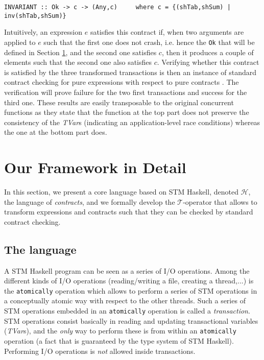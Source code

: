 \documentclass[submission,copyright,creativecommons]{eptcs}
\newcommand{\pt}{\ensuremath{\mathcal{T}}}
\begin{document}
\begin{footnotesize}
\begin{verbatim}
INVARIANT :: Ok -> c -> (Any,c)     where c = {(shTab,shSum) | inv(shTab,shSum)} 
\end{verbatim}
\end{footnotesize}
Intuitively, an expression $e$ satisfies this contract if, when two arguments are applied to $e$ such that the first one does not crash, i.e. hence the \texttt{Ok} that will be defined in Section \ref{details}, and the second one satisfies $c$, then it produces a couple of elements such that the second one also satisfies $c$.  
Verifying whether this contract is satisfied by the three transformed transactions is then an instance of standard contract checking for pure expressions with respect to pure contracts \cite{static-contract-checking}. The verification will prove failure for the two first transactions and success for the third one. 
These results are easily transposable to the original concurrent functions as they state that the function at the top part does not preserve the consistency of the \emph{TVar}s (indicating an application-level race conditions) whereas the one at the bottom part does.


\section{Our Framework in Detail}
\label{details}
In this section, we present a core language based on STM Haskell, denoted $\mathcal{H}$, the language of {\em contracts}, and we formally develop the $\pt$-operator that allows to transform expressions and contracts such that they can be checked by standard contract checking.



\subsection{The language}
\label{language}


A STM Haskell program can be seen as a series of I/O operations. 
Among the different kinds of I/O operations (reading/writing a file, creating a thread,...) is the \texttt{atomically} operation which allows to perform a series of STM operations in a conceptually atomic way with respect to the other threads. Such a series of STM operations embedded in an \texttt{atomically} operation is called a \emph{transaction}. 
STM operations consist basically in reading and updating transactional variables (\emph{TVar}s), and the \emph{only} way to perform these is from within an \texttt{atomically} operation (a fact that is guaranteed by the type system of STM Haskell). Performing I/O operations is \emph{not} allowed inside transactions.
\end{document}
